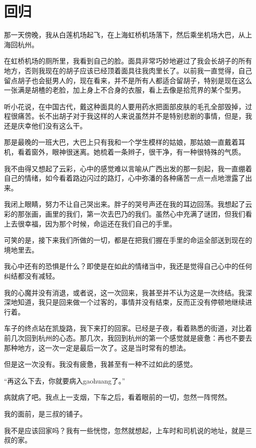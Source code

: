 \chapter{回归}

那一天傍晚，我从白莲机场起飞，在上海虹桥机场落下，然后乘坐机场大巴，从上海回杭州。

在虹桥机场的厕所里，我看到自己的脸。面具非常巧妙地避过了我会长胡子的所有地方，否则我现在的胡子应该已经顶着面具往我肉里长了。以前我一直觉得，自己留点胡子也会挺男人的，现在看来，并不是所有人都适合留胡子，特别是现在这么一张满是胡楂的老脸，加上身上不合身的衣服，看上去像是拾荒界的某个型男。

听小花说，在中国古代，戴这种面具的人要用药水把面部皮肤的毛孔全部毁掉，过程很痛苦。长不出胡子对于我这样的人来说虽然并不是特别悲剧的事情，但是，我还是庆幸他们没有这么干。

那是最晚的一班大巴，大巴上只有我和一个学生模样的姑娘，那姑娘一直戴着耳机，看着窗外，眼神很迷离。她梳着一条辫子，很干净，有一种很特殊的气质。

我不由得又想起了云彩，心中的感觉难以言喻从广西出发的那一刻起，我一直绷着自己的情绪，如今看着路边闪过的路灯，心中弥潘的各种痛苦一点一点地泄露了出来。

我闭上眼睛，努力不让自己哭出来。胖子的哭号声还在我的耳边回荡。我想起了云彩的那张画，画里的我们，第一次去巴乃的我们。虽然心中充满了谜团，但我们看上去很幸福，因为那个时候，命运还在我们自己的手里。

可笑的是，接下来我们所做的一切，都是在把我们握在手里的命运全部送到现在的境地里去。

我心中还有的恐惧是什么？即使是在如此的情绪当中，我还是觉得自己心中的任何纠结都没有减轻。

我的心魔并没有消退，或者说，这一次回来，我甚至并不认为这是一次终结。我深深地知道，我只是回来做一个过客的，事情并没有结束，反而正没有停顿地继续进行着。

车子的终点站在凯旋路，我下来打的回家。已经是子夜，看着熟悉的街道，对比着前几次回到杭州的心态。那几次，我回到杭州的第一个感觉就是疲惫：再也不要去那种地方，这一次一定是最后一次了。这是当时常有的想法。

但是这一次没有。我没有疲惫，我甚至有一种不过如此的感觉。

“再这么下去，你就要病入gaohuang了。”

病就病了吧。我点上一支烟，下车之后，看着眼前的一切，忽然一阵愕然。

我的面前，是三叔的铺子。

我不是应该回家吗？我有一些恍惚，忽然就想起，上车时和司机说的地址，就是三叔的家。

